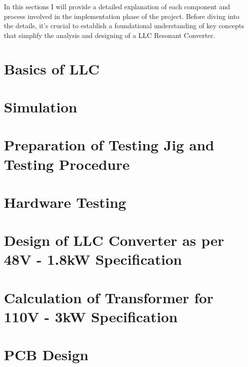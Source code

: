 In this sections I will provide a detailed explanation of each component and
process involved in the implementation phase of the project. Before diving into
the details, it's crucial to establish a foundational understanding of key
concepts that simplify the analysis and designing of a LLC Resonant Converter.

\section{Basics of LLC}

\section{Simulation}

\section{Preparation of Testing Jig and Testing Procedure}

\section{Hardware Testing}

\section{Design of LLC Converter as per 48V - 1.8kW Specification}

\section{Calculation of Transformer for 110V - 3kW Specification}

\section{PCB Design}

